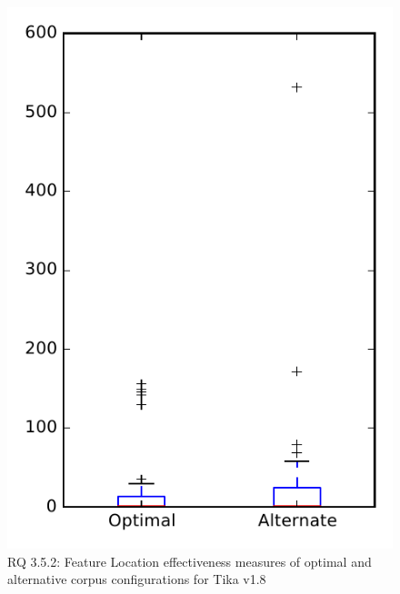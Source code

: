 
\begin{figure}
\centering
\includegraphics[height=0.4\textheight]{figures/combo/flt_rq2_tika}
\caption{RQ 3.5.2: Feature Location effectiveness measures of optimal and alternative corpus configurations for Tika v1.8}
\label{fig:combo:flt:rq2:tika}
\end{figure}
